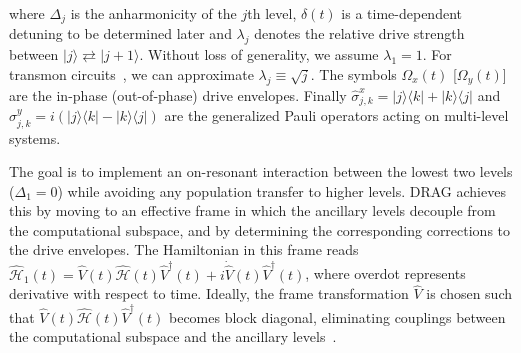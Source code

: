 \documentclass[superscriptaddress,amsmath,amssymb,aps,twocolumn,praplied,notitlepage]{revtex4-2}
\newcommand{\ket}[1]{\vert #1 \rangle}
\begin{document}
where $\Delta_{j}$ is the anharmonicity of the $j$th level, $\delta(t)$ is a time-dependent detuning to be determined later and $\lambda_j$ denotes the relative drive strength between $\ket{j}\rightleftarrows\ket{j+1}$. Without loss of generality, we assume $\lambda_1=1$. For transmon circuits~\cite{PhysRevA.76.042319, Khani2009Optimal}, we can approximate $\lambda_j\equiv\sqrt{j}$. The symbols $\Omega_{x}(t)$ [$\Omega_{y}(t)$] are the in-phase (out-of-phase) drive envelopes. Finally $\hat{\sigma}^x_{j,k}= |j\rangle \langle k| + |k\rangle \langle j|$ and  $\sigma^y_{j,k}= i(|j\rangle \langle k| - |k\rangle \langle j|)$ are the generalized Pauli operators acting on multi-level systems.

The goal is to implement an on-resonant interaction between the lowest two levels (\(\Delta_1=0\)) while avoiding any population transfer to higher levels.
DRAG achieves this by moving to an effective frame in which the ancillary levels decouple from the computational subspace, and by determining the corresponding corrections to the drive envelopes. The Hamiltonian in this frame reads $\hat{\mathcal{H}}_{1}(t) = \hat{V}(t)\hat{\mathcal{H}}(t)\hat{V}^{\dag}(t)+i \dot{\hat{V}}(t)\hat{V}^{\dag}(t)$, where overdot represents derivative with respect to time. 
Ideally, the frame transformation \(\hat{V}\) is chosen such that \(\hat{V}(t)\hat{\mathcal{H}}(t)\hat{V}^{\dag}(t)\) becomes block diagonal, eliminating couplings between the computational subspace and the ancillary levels~\cite{Li2022Nonperturbative}.
\end{document}
